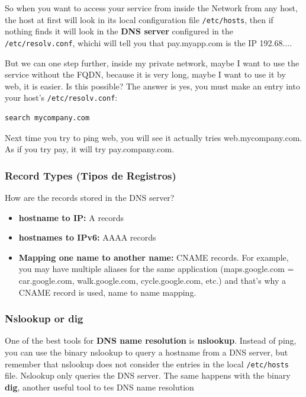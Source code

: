 \documentclass{article}
\newenvironment{codetemplate}[1][]{%
  \mybasecolorbox[#1]
  \itshape
}{%
  \endmybasecolorbox
}
\begin{document}
So when you want to access your service from inside the Network from any host, the host at first will look in its local configuration file \verb|/etc/hosts|, then if nothing finds it will look in the \textbf{DNS server} configured in the \verb|/etc/resolv.conf|, whichi will tell you that pay.myapp.com is the IP 192.68....

But we can one step further, inside my private network, maybe I want to use the service without the FQDN, because it is very long, maybe I want to use it by web, it is easier. Is this possible? The answer is yes, you must make an entry into your host's \verb|/etc/resolv.conf|:

\begin{codetemplate}{}
\begin{verbatim}
search mycompany.com
\end{verbatim}
\end{codetemplate}

Next time you try to ping web, you will see it actually tries web.mycompany.com. As if you try pay, it will try pay.company.com.

\subsubsection{Record Types (Tipos de Registros)}

How are the records stored in the DNS server?

\begin{itemize}
    \item \textbf{hostname to IP:} A records
    \item \textbf{hostnames to IPv6:} AAAA records
    \item \textbf{Mapping one name to another name:} CNAME records. For example, you may have multiple aliases for the same application (maps.google.com = car.google.com, walk.google.com, cycle.google.com, etc.) and that's why a CNAME record is used, name to name mapping.
\end{itemize}

\subsubsection{Nslookup or dig}
One of the best tools for \textbf{DNS name resolution} is \textbf{nslookup}. Instead of ping, you can use the binary nslookup to query a hostname from a DNS server, but remember that nslookup does not consider the entries in the local \verb|/etc/hosts| file. Nslookup only queries the DNS server. The same happens with the binary \textbf{dig}, another useful tool to tes DNS name resolution
\end{document}
